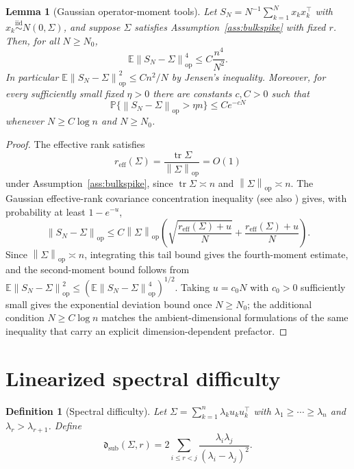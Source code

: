 \documentclass[11pt]{article}
\theoremstyle{tightplain}
\newtheorem{lemma}[theorem]{Lemma}
\theoremstyle{tightdef}
\newtheorem{definition}[theorem]{Definition}
\DeclareMathOperator{\tr}{tr}
\DeclareMathOperator{\op}{op}
\newcommand{\E}{\mathbb E}
\newcommand{\Prob}{\mathbb P}
\newcommand{\norm}[1]{\left\lVert #1 \right\rVert}
\begin{document}
\begin{lemma}[Gaussian operator-moment tools]\label{lem:covopmoments}
Let $S_N=N^{-1}\sum_{k=1}^N x_kx_k^\top$ with
$x_k\stackrel{\mathrm{iid}}{\sim}N(0,\Sigma)$, and suppose $\Sigma$ satisfies
Assumption~\ref{ass:bulkspike} with fixed $r$. Then, for all $N\ge N_0$,
\[
\E\norm{S_N-\Sigma}_{\op}^4\le C\frac{n^4}{N^2}.
\]
In particular $\E\norm{S_N-\Sigma}_{\op}^2\le Cn^2/N$ by Jensen's inequality.
Moreover, for every sufficiently small fixed $\eta>0$ there are constants
$c,C>0$ such that
\[
\Prob\bigl\{\norm{S_N-\Sigma}_{\op}>\eta n\bigr\}\le Ce^{-cN}
\]
whenever $N\ge C\log n$ and $N\ge N_0$.
\end{lemma}

\begin{proof}
The effective rank satisfies
\[
r_{\mathrm{eff}}(\Sigma)=\frac{\tr\Sigma}{\norm{\Sigma}_{\op}}=O(1)
\]
under Assumption~\ref{ass:bulkspike}, since $\tr\Sigma\asymp n$ and
$\norm{\Sigma}_{\op}\asymp n$. The Gaussian effective-rank covariance
concentration inequality \cite[Thm.~9]{KoltchinskiiLounici2017} (see also
\cite[Ch.~4--5]{Vershynin2018}) gives, with probability at least $1-e^{-u}$,
\[
\norm{S_N-\Sigma}_{\op}
\le
C\norm{\Sigma}_{\op}
\left(
\sqrt{\frac{r_{\mathrm{eff}}(\Sigma)+u}{N}}
+
\frac{r_{\mathrm{eff}}(\Sigma)+u}{N}
\right).
\]
Since $\norm{\Sigma}_{\op}\asymp n$, integrating this tail bound gives the
fourth-moment estimate, and the second-moment bound follows from
$\E\norm{S_N-\Sigma}_{\op}^2\le(\E\norm{S_N-\Sigma}_{\op}^4)^{1/2}$. Taking
$u=c_0N$ with $c_0>0$ sufficiently small gives the exponential deviation bound
once $N\ge N_0$; the additional condition $N\ge C\log n$ matches the
ambient-dimensional formulations of the same inequality that carry an explicit
dimension-dependent prefactor.
\end{proof}

\section{Linearized spectral difficulty}

\begin{definition}[Spectral difficulty]\label{def:dsub}
Let $\Sigma=\sum_{k=1}^n\lambda_k u_k u_k^\top$ with
$\lambda_1\ge\cdots\ge\lambda_n$ and $\lambda_r>\lambda_{r+1}$. Define
\[
\mathfrak d_{\mathrm{sub}}(\Sigma,r)
=2\sum_{i\le r<j}\frac{\lambda_i\lambda_j}{(\lambda_i-\lambda_j)^2}.
\]
\end{definition}
\end{document}
